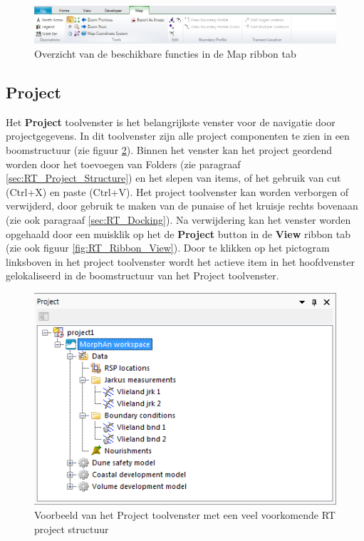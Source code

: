 \begin{figure}[H]
	\centering
		\includegraphics[width=1.0\textwidth]{figures/chapter_general/RT_Map.png}
		\caption{Overzicht van de beschikbare functies in de Map ribbon tab}
	\label{fig:RT_Ribbon_Map}
\end{figure}

\subsection{Project}
	\label{sec:RT_Project_Explorer}
Het \textbf{Project} toolvenster is het belangrijkste venster voor de navigatie door projectgegevens. In dit toolvenster zijn alle project componenten te zien in een boomstructuur (zie figuur \ref{fig:RT_Project_Explorer}). Binnen het venster kan het project geordend worden door het toevoegen van Folders (zie paragraaf \ref{sec:RT_Project_Structure}) en het slepen van items, of het gebruik van cut (Ctrl+X) en paste (Ctrl+V). Het project toolvenster kan worden verborgen of verwijderd, door gebruik te maken van de punaise of het kruisje rechts bovenaan (zie ook paragraaf \ref{sec:RT_Docking}). Na verwijdering kan het venster worden opgehaald door een muisklik op het de \textbf{Project} button in de \textbf{View} ribbon tab (zie ook figuur \ref{fig:RT_Ribbon_View}). Door te klikken op het pictogram linksboven in het project toolvenster wordt het actieve item in het hoofdvenster gelokaliseerd in de boomstructuur van het Project toolvenster.

\begin{figure}[H]
	\centering
		\includegraphics{figures/chapter_general/Project_Explorer_RTData.png}
		\caption{Voorbeeld van het Project toolvenster met een veel voorkomende RT project structuur}
	\label{fig:RT_Project_Explorer}
\end{figure}


